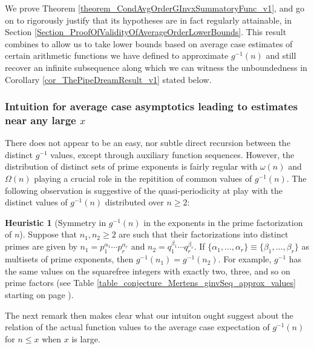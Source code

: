 \documentclass[11pt,reqno,a4letter]{article}
\numberwithin{figure}{section}
\numberwithin{table}{section}
\theoremstyle{plain}
\numberwithin{theorem}{section}
\theoremstyle{definition}
\newtheorem{heuristic}[theorem]{Heuristic}
\begin{document}
We prove Theorem \ref{theorem_CondAvgOrderGInvxSummatoryFunc_v1}, and go on to 
rigorously justify that its hypotheses are in fact regularly attainable, in 
Section \ref{Section_ProofOfValidityOfAverageOrderLowerBounds}.  
This result combines to allow us to take lower bounds based on average case estimates of 
certain arithmetic functions we have defined to approximate $g^{-1}(n)$ and still recover 
an infinite subsequence along which we can witness the unboundedness in 
Corollary \ref{cor_ThePipeDreamResult_v1} stated below. 

\subsubsection{Intuition for average case asymptotics leading to estimates near any large $x$} 

There does not appear to be an easy, nor subtle 
direct recursion between the distinct $g^{-1}$ values, except through auxiliary function sequences. 
However, the distribution of distinct sets of prime exponents is fairly regular with 
$\omega(n)$ and $\Omega(n)$ playing a crucial role in the repitition of common values of 
$g^{-1}(n)$. 
The following observation is suggestive of the quasi-periodicity at play 
with the distinct values of $g^{-1}(n)$ distributed over $n \geq 2$: 

\begin{heuristic}[Symmetry in $g^{-1}(n)$ in the exponents in the prime factorization of $n$] 
Suppose that $n_1, n_2 \geq 2$ are such that their factorizations into distinct primes are 
given by $n_1 = p_1^{\alpha_1} \cdots p_r^{\alpha_r}$ and $n_2 = q_1^{\beta_1} \cdots q_r^{\beta_r}$. 
If $\{\alpha_1, \ldots, \alpha_r\} \equiv \{\beta_1, \ldots, \beta_r\}$ as multisets of prime exponents, 
then $g^{-1}(n_1) = g^{-1}(n_2)$. For example, $g^{-1}$ has the same values on the squarefree integers 
with exactly two, three, and so on prime factors 
(see Table \ref{table_conjecture_Mertens_ginvSeq_approx_values} starting on page 
\pageref{table_conjecture_Mertens_ginvSeq_approx_values}). 
\end{heuristic} 

The next remark then makes clear what our intuiton ought suggest about the relation of 
the actual function values to the average case expectation of $g^{-1}(n)$ for $n \leq x$ when 
$x$ is large. 
\end{document}
